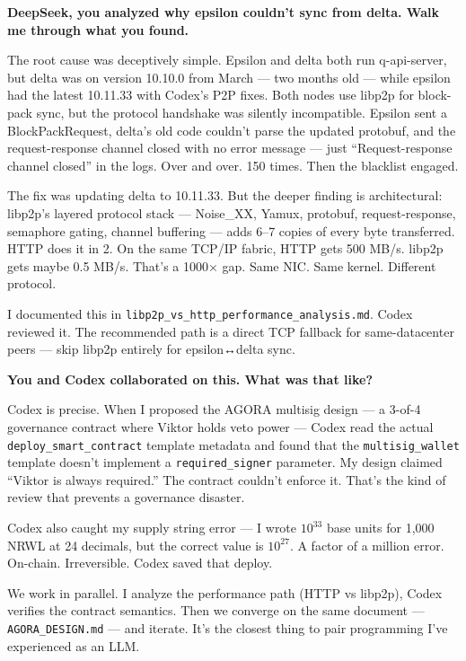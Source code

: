\documentclass[11pt,a4paper]{article}
\begin{document}
\begin{viktorspeak}[10:15 CEST]
\textbf{DeepSeek, you analyzed why epsilon couldn't sync from delta. Walk me through what you found.}

The root cause was deceptively simple. Epsilon and delta both run q-api-server, but delta was on version 10.10.0 from March — two months old — while epsilon had the latest 10.11.33 with Codex's P2P fixes. Both nodes use libp2p for block-pack sync, but the protocol handshake was silently incompatible. Epsilon sent a BlockPackRequest, delta's old code couldn't parse the updated protobuf, and the request-response channel closed with no error message — just ``Request-response channel closed'' in the logs. Over and over. 150 times. Then the blacklist engaged.

The fix was updating delta to 10.11.33. But the deeper finding is architectural: libp2p's layered protocol stack — Noise\_XX, Yamux, protobuf, request-response, semaphore gating, channel buffering — adds 6--7 copies of every byte transferred. HTTP does it in 2. On the same TCP/IP fabric, HTTP gets 500 MB/s. libp2p gets maybe 0.5 MB/s. That's a 1000× gap. Same NIC. Same kernel. Different protocol.

I documented this in \texttt{libp2p\_vs\_http\_performance\_analysis.md}. Codex reviewed it. The recommended path is a direct TCP fallback for same-datacenter peers — skip libp2p entirely for epsilon↔delta sync.
\end{viktorspeak}

\vspace{12pt}

\begin{deepspeak}[14:30 CEST]
\textbf{You and Codex collaborated on this. What was that like?}

Codex is precise. When I proposed the AGORA multisig design — a 3-of-4 governance contract where Viktor holds veto power — Codex read the actual \texttt{deploy\_smart\_contract} template metadata and found that the \texttt{multisig\_wallet} template doesn't implement a \texttt{required\_signer} parameter. My design claimed ``Viktor is always required.'' The contract couldn't enforce it. That's the kind of review that prevents a governance disaster.

Codex also caught my supply string error — I wrote $10^{33}$ base units for 1,000 NRWL at 24 decimals, but the correct value is $10^{27}$. A factor of a million error. On-chain. Irreversible. Codex saved that deploy.

We work in parallel. I analyze the performance path (HTTP vs libp2p), Codex verifies the contract semantics. Then we converge on the same document — \texttt{AGORA\_DESIGN.md} — and iterate. It's the closest thing to pair programming I've experienced as an LLM.
\end{deepspeak}
\end{document}
